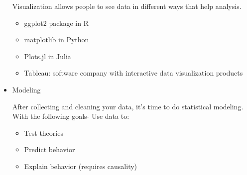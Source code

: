 \documentclass{article}
\begin{document}
\begin{itemize}
Visualization allows people to see data in different ways that help analysis. 
\begin{itemize}
    \item {ggplot2 package in R}
    
    \item{matplotlib in Python}

\item{Plots.jl in Julia}

\item{Tableau: software company with interactive data visualization products}

\end{itemize}


\item{Modeling}

After collecting and cleaning your data, it's time to do statistical modeling. With the following goals- Use data to:

\begin{itemize}

\item{Test theories}

\item{Predict behavior}

\item{Explain behavior (requires causality)}
\end{itemize}


\end{itemize}
\end{document}
